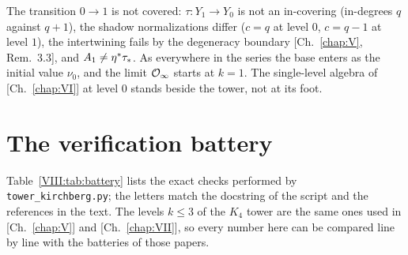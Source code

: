 \begin{remark}\label{VIII:rem:boundary}
The transition $0\to1$ is not covered: $\tau\colon Y_1\to Y_0$ is not an in-covering
(in-degrees $q$ against $q{+}1$), the shadow normalizations differ ($c=q$ at level $0$,
$c=q-1$ at level $1$), the intertwining fails by the degeneracy boundary [Ch.~\ref{chap:V}, Rem.~3.3],
and $A_1\ne\eta^*\tau_*$. As everywhere in the series the base enters as the initial value
$\nu_0$, and the limit $\mathcal{O}_\infty$ starts at $k=1$. The single-level algebra of [Ch.~\ref{chap:VI}] at
level $0$ stands beside the tower, not at its foot.
\end{remark}

\section{The verification battery}\label{VIII:sec:battery}

Table~\ref{VIII:tab:battery} lists the exact checks performed by \texttt{tower\_kirchberg.py};
the letters match the docstring of the script and the references in the text. The
levels $k\le3$ of the $K_4$ tower are the same ones used in [Ch.~\ref{chap:V}] and [Ch.~\ref{chap:VII}], so every
number here can be compared line by line with the batteries of those papers.

